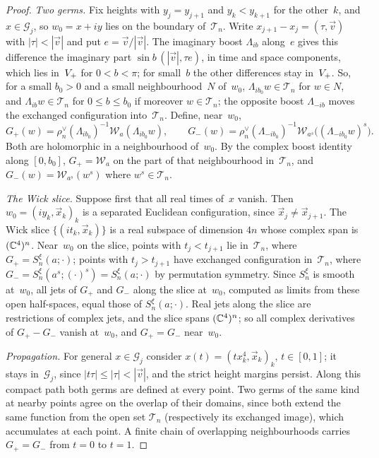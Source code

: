 \begin{proof}
\emph{Two germs.} Fix heights with $y_j=y_{j+1}$ and $y_k<y_{k+1}$ for the other~$k$, and $x\in\mathcal G_j$, so $w_0=x+iy$ lies on the boundary of~$\mathcal T_n$. Write $x_{j+1}-x_j=(\tau,\vec v)$ with $|\tau|<|\vec v|$ and put $e=\vec v/|\vec v|$. The imaginary boost $\Lambda_{ib}$ along~$e$ gives this difference the imaginary part $\sin b\,(|\vec v|,\tau e)$, in time and space components, which lies in~$V_+$ for $0<b<\pi$; for small~$b$ the other differences stay in~$V_+$. So, for a small $b_0>0$ and a small neighbourhood~$N$ of~$w_0$, $\Lambda_{ib_0}w\in\mathcal T_n$ for $w\in N$, and $\Lambda_{ib}w\in\mathcal T_n$ for $0\le b\le b_0$ if moreover $w\in\mathcal T_n$; the opposite boost $\Lambda_{-ib}$ moves the exchanged configuration into~$\mathcal T_n$. Define, near~$w_0$,
\begin{equation*}
G_+(w)=\rho_n^\vee(\Lambda_{ib_0})^{-1}\mathcal W_a(\Lambda_{ib_0}w),\qquad
G_-(w)=\rho_n^\vee(\Lambda_{-ib_0})^{-1}\mathcal W_{a^s}\bigl((\Lambda_{-ib_0}w)^s\bigr).
\end{equation*}
Both are holomorphic in a neighbourhood of~$w_0$. By the complex boost identity along $[0,b_0]$, $G_+=\mathcal W_a$ on the part of that neighbourhood in~$\mathcal T_n$, and $G_-(w)=\mathcal W_{a^s}(w^s)$ where $w^s\in\mathcal T_n$.

\emph{The Wick slice.} Suppose first that all real times of~$x$ vanish. Then $w_0=(iy_k,\vec x_k)_k$ is a separated Euclidean configuration, since $\vec x_j\ne\vec x_{j+1}$. The Wick slice $\{(it_k,\vec x_k)\}$ is a real subspace of dimension $4n$ whose complex span is $(\mathbb{C}^4)^n$. Near~$w_0$ on the slice, points with $t_j<t_{j+1}$ lie in~$\mathcal T_n$, where $G_+=S^\xi_n(a;\cdot)$; points with $t_j>t_{j+1}$ have exchanged configuration in~$\mathcal T_n$, where $G_-=S^\xi_n(a^s;(\cdot)^s)=S^\xi_n(a;\cdot)$ by permutation symmetry. Since $S^\xi_n$ is smooth at~$w_0$, all jets of $G_+$ and $G_-$ along the slice at~$w_0$, computed as limits from these open half-spaces, equal those of $S^\xi_n(a;\cdot)$. Real jets along the slice are restrictions of complex jets, and the slice spans $(\mathbb{C}^4)^n$; so all complex derivatives of $G_+-G_-$ vanish at~$w_0$, and $G_+=G_-$ near~$w_0$.

\emph{Propagation.} For general $x\in\mathcal G_j$ consider $x(t)=(tx_k^4,\vec x_k)_k$, $t\in[0,1]$; it stays in~$\mathcal G_j$, since $|t\tau|\le|\tau|<|\vec v|$, and the strict height margins persist. Along this compact path both germs are defined at every point. Two germs of the same kind at nearby points agree on the overlap of their domains, since both extend the same function from the open set $\mathcal T_n$ (respectively its exchanged image), which accumulates at each point. A finite chain of overlapping neighbourhoods carries $G_+=G_-$ from $t=0$ to $t=1$.


\end{proof}
